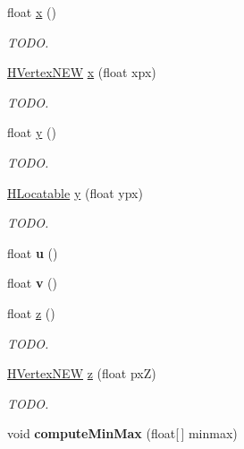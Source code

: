 \begin{DoxyCompactItemize}
\item 
float \hyperlink{classhype_1_1extended_1_1util_1_1_h_vertex_n_e_w_a88dc678f903a648e8a546e9dce3489b2}{x} ()
\begin{DoxyCompactList}\small\item\em T\-O\-D\-O. \end{DoxyCompactList}\item 
\hyperlink{classhype_1_1extended_1_1util_1_1_h_vertex_n_e_w}{H\-Vertex\-N\-E\-W} \hyperlink{classhype_1_1extended_1_1util_1_1_h_vertex_n_e_w_a9e10d6660dbb2511c6daf68fab619fbd}{x} (float xpx)
\begin{DoxyCompactList}\small\item\em T\-O\-D\-O. \end{DoxyCompactList}\item 
float \hyperlink{classhype_1_1extended_1_1util_1_1_h_vertex_n_e_w_ae52e4251b075170b5a4485386ad82575}{y} ()
\begin{DoxyCompactList}\small\item\em T\-O\-D\-O. \end{DoxyCompactList}\item 
\hyperlink{interfacehype_1_1core_1_1interfaces_1_1_h_locatable}{H\-Locatable} \hyperlink{classhype_1_1extended_1_1util_1_1_h_vertex_n_e_w_aca01d92a7c4b83ad136dd9ec371693fa}{y} (float ypx)
\begin{DoxyCompactList}\small\item\em T\-O\-D\-O. \end{DoxyCompactList}\item 
\hypertarget{classhype_1_1extended_1_1util_1_1_h_vertex_n_e_w_a600d7d1c92154cd441617ea663c0a7a2}{float {\bfseries u} ()}\label{classhype_1_1extended_1_1util_1_1_h_vertex_n_e_w_a600d7d1c92154cd441617ea663c0a7a2}

\item 
\hypertarget{classhype_1_1extended_1_1util_1_1_h_vertex_n_e_w_a5288074f7889946519216b843042db5c}{float {\bfseries v} ()}\label{classhype_1_1extended_1_1util_1_1_h_vertex_n_e_w_a5288074f7889946519216b843042db5c}

\item 
float \hyperlink{classhype_1_1extended_1_1util_1_1_h_vertex_n_e_w_ab38eeaac5201a23670dc4ffc9f2947a3}{z} ()
\begin{DoxyCompactList}\small\item\em T\-O\-D\-O. \end{DoxyCompactList}\item 
\hyperlink{classhype_1_1extended_1_1util_1_1_h_vertex_n_e_w}{H\-Vertex\-N\-E\-W} \hyperlink{classhype_1_1extended_1_1util_1_1_h_vertex_n_e_w_ad16fb4525132a36f5fe4b7d4c63ef57a}{z} (float px\-Z)
\begin{DoxyCompactList}\small\item\em T\-O\-D\-O. \end{DoxyCompactList}\item 
\hypertarget{classhype_1_1extended_1_1util_1_1_h_vertex_n_e_w_a29f5f9cbb4c8a7eb2df730f2a7bbb305}{void {\bfseries compute\-Min\-Max} (float\mbox{[}$\,$\mbox{]} minmax)}\label{classhype_1_1extended_1_1util_1_1_h_vertex_n_e_w_a29f5f9cbb4c8a7eb2df730f2a7bbb305}


\end{DoxyCompactItemize}
